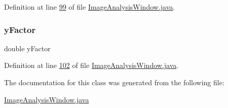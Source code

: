Definition at line \hyperlink{_image_analysis_window_8java_source_l00099}{99} of file \hyperlink{_image_analysis_window_8java_source}{Image\+Analysis\+Window.\+java}.

\hypertarget{classgui_1_1_image_analysis_window_ab483275b2379ef6043da68efe593b5d9}{}\label{classgui_1_1_image_analysis_window_ab483275b2379ef6043da68efe593b5d9} 
\subsubsection{\texorpdfstring{y\+Factor}{yFactor}}
{\footnotesize\ttfamily double y\+Factor\hspace{0.3cm}{\ttfamily [protected]}}



Definition at line \hyperlink{_image_analysis_window_8java_source_l00102}{102} of file \hyperlink{_image_analysis_window_8java_source}{Image\+Analysis\+Window.\+java}.



The documentation for this class was generated from the following file\+:\begin{DoxyCompactItemize}
\item 
\hyperlink{_image_analysis_window_8java}{Image\+Analysis\+Window.\+java}\end{DoxyCompactItemize}
